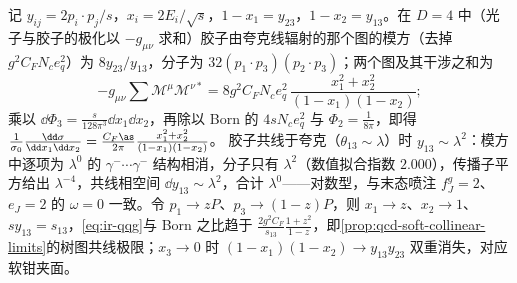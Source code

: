 \begin{example}\label{ex:ir-real-emission}
记 $y_{ij}=2p_i\cdot p_j/s$，$x_i=2E_i/\sqrt s$，$1-x_1=y_{23}$，$1-x_2=y_{13}$。在 $D=4$ 中（光子与胶子的极化以 $-g_{\mu\nu}$ 求和）胶子由夸克线辐射的那个图的模方（去掉 $g^2C_FN_ce_q^2$）为 $8y_{23}/y_{13}$，分子为 $32(p_1\cdot p_3)(p_2\cdot p_3)$；两个图及其干涉之和为
\begin{equation}\label{eq:ir-qqg}
-g_{\mu\nu}\sum\mathcal M^\mu\mathcal M^{\nu*}=8g^2C_FN_ce_q^2\,\frac{x_1^2+x_2^2}{(1-x_1)(1-x_2)} ;
\end{equation}
乘以 $\dd\Phi_3=\frac{s}{128\pi^3}\dd x_1\dd x_2$，再除以 Born 的 $4sN_ce_q^2$ 与 $\Phi_2=\frac1{8\pi}$，即得 $\frac1{\sigma_0}\frac{\dd\sigma}{\dd x_1\dd x_2}=\frac{C_F\as}{2\pi}\frac{x_1^2+x_2^2}{(1-x_1)(1-x_2)}$。%
胶子共线于夸克（$\theta_{13}\sim\lambda$）时 $y_{13}\sim\lambda^2$：模方中逐项为 $\lambda^0$ 的 $\gamma^-\cdots\gamma^-$ 结构相消，分子只有 $\lambda^2$（数值拟合指数 $2.000$），传播子平方给出 $\lambda^{-4}$，共线相空间 $\dd y_{13}\sim\lambda^2$，合计 $\lambda^0$——对数型，与末态喷注 $f^g_J=2$、$e_J=2$ 的 $\omega=0$ 一致。令 $p_1\to zP$、$p_3\to(1-z)P$，则 $x_1\to z$、$x_2\to1$、$sy_{13}=s_{13}$，\cref{eq:ir-qqg}与 Born 之比趋于 $\frac{2g^2C_F}{s_{13}}\frac{1+z^2}{1-z}$，即\cref{prop:qcd-soft-collinear-limits}的树图共线极限；$x_3\to0$ 时 $(1-x_1)(1-x_2)\to y_{13}y_{23}$ 双重消失，对应软钳夹面。
\end{example}
